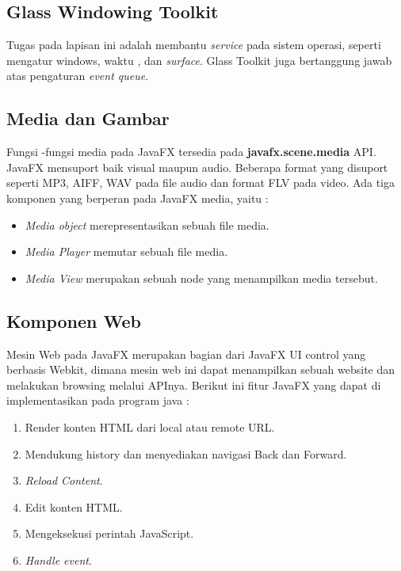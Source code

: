 \subsection{Glass Windowing Toolkit}
\label{subs:Glass_Windowing_Toolkit}
Tugas pada lapisan ini adalah membantu \textit{service} pada sistem operasi, seperti mengatur windows, waktu , dan \textit{surface}. Glass Toolkit juga bertanggung jawab atas pengaturan \textit{event queue}.\cite{javafx}

\subsection{Media dan Gambar}
\label{subs:Media_Gambar}
Fungsi -fungsi media pada JavaFX tersedia pada \textbf{javafx.scene.media} API. JavaFX mensuport baik visual maupun audio. Beberapa format yang disuport seperti MP3, AIFF, WAV pada file audio dan format FLV pada video. Ada tiga komponen yang berperan pada JavaFX media, yaitu :\cite{javafx} 
\begin{itemize}
	\item \textit{Media object} merepresentasikan sebuah file media.
	\item \textit{Media Player} memutar sebuah file media.
	\item \textit{Media View} merupakan sebuah node yang menampilkan media tersebut.
\end{itemize}

\subsection{Komponen Web}
\label{subs:Komponen_Web}
Mesin Web pada JavaFX merupakan bagian dari JavaFX UI control yang berbasis Webkit, dimana mesin web ini dapat menampilkan sebuah website dan melakukan browsing melalui APInya. Berikut ini fitur JavaFX yang dapat di implementasikan pada program java :\cite{javafx}
\begin{enumerate}
	\item Render konten HTML dari local atau remote URL.
	\item Mendukung history dan menyediakan navigasi Back dan Forward.
	\item \textit{Reload Content}.
	\item Edit konten HTML.
	\item Mengeksekusi perintah JavaScript.
	\item \textit{Handle event}.
\end{enumerate} 

